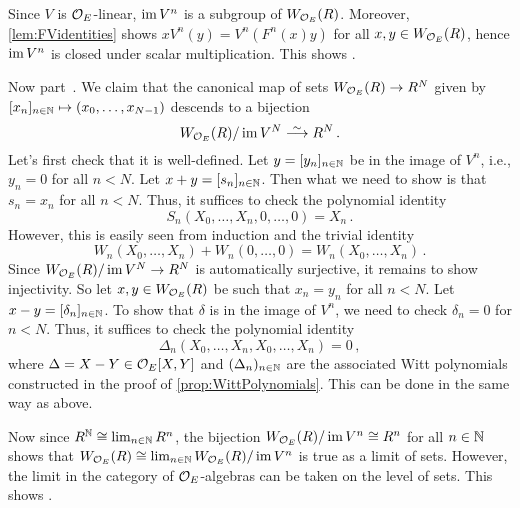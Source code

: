 \begin{proof*}
	Since $V$ is $\mathcal{O}_E$-linear, $\operatorname{im} V^n$ is a subgroup of $W_{\mathcal{O}_E}(R)$. Moreover, \cref{lem:FVidentities} shows $xV^n(y)=V^n(F^n(x)y)$ for all $x,y\in W_{\mathcal{O}_E}(R)$, hence $\operatorname{im} V^n$ is closed under scalar multiplication. This shows .
	
	Now part~. We claim that the canonical map of sets $W_{\Oo_E}(R)\morphism R^N$ given by $[x_n]_{n\in\mathbb{N}}\mapsto (x_0,\dotsc,x_{N-1})$ descends to a bijection
	\begin{equation*}
		W_{\Oo_E}(R)/\im V^N\isomorphism R^N\,.
	\end{equation*}
	Let's first check that it is well-defined. Let $y=[y_n]_{n\in \mathbb{N}}$ be in the image of $V^n$, i.e., $y_n=0$ for all $n< N$. Let $x+y=[s_n]_{n\in \mathbb{N}}$. Then what we need to show is that $s_n=x_n$ for all $n<N$. Thus, it suffices to check the polynomial identity
	\begin{equation*}
		S_n(X_0,\dotsc,X_n,0,\dotsc,0)=X_n\,.
	\end{equation*}
	However, this is easily seen from induction and the trivial identity
	\begin{equation*}
		W_n(X_0,\dotsc,X_n)+W_n(0,\dotsc,0)=W_n(X_0,\dotsc,X_n)\,.
	\end{equation*}
	Since $W_{\Oo_E}(R)/\im V^N\morphism R^N$ is automatically surjective, it remains to show injectivity. So let $x,y\in W_{\mathcal{O}_E}(R)$ be such that $x_n=y_n$ for all $n<N$. Let $x-y=[\delta_n]_{n\in\mathbb{N}}$. To show that $\delta$ is in the image of $V^n$, we need to check $\delta_n=0$ for $n<N$. Thus, it suffices to check the polynomial identity
	\begin{equation*}
		\Delta_n(X_0,\dotsc,X_n,X_0,\dotsc,X_n)=0\,,
	\end{equation*}
	where $\Delta=X-Y\in\mathcal{O}_E[X,Y]$ and $(\Delta_n)_{n\in\mathbb{N}}$ are the associated Witt polynomials constructed in the proof of \cref{prop:WittPolynomials}. This can be done in the same way as above.
	
	Now since $R^{\mathbb{N}}\cong \operatorname*{lim}_{n\in\mathbb{N}}R^n$, the bijection $W_{\mathcal{O}_E}(R)/\operatorname{im} V^n\cong R^n$ for all $n\in \mathbb{N}$ shows that $W_{\mathcal{O}_E}(R)\cong \operatorname*{lim}_{n\in\mathbb{N}}W_{\mathcal{O}_E}(R)/\operatorname{im} V^n$ is true as a limit of sets. However, the limit in the category of $\mathcal{O}_E$-algebras can be taken on the level of sets. This shows .
	

\end{proof*}
